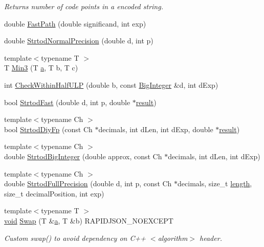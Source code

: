 \begin{DoxyCompactItemize}
\begin{DoxyCompactList}\small\item\em Returns number of code points in a encoded string. \end{DoxyCompactList}\item 
double \hyperlink{namespaceinternal_aa1bb51d788788eb5390a16462b40d98d}{Fast\+Path} (double significand, int exp)
\item 
double \hyperlink{namespaceinternal_a9e5fac4695310f09892fe52b1d24ab19}{Strtod\+Normal\+Precision} (double d, int p)
\item 
{\footnotesize template$<$typename T $>$ }\\T \hyperlink{namespaceinternal_ace304441347098a4953ea99f50805da9}{Min3} (T \hyperlink{pointer_8h_aeeddce917cf130d62c370b8f216026dd}{a}, T b, T c)
\item 
int \hyperlink{namespaceinternal_a190f9c286df64526a7e3550528ed6b02}{Check\+Within\+Half\+U\+LP} (double b, const \hyperlink{classinternal_1_1BigInteger}{Big\+Integer} \&d, int d\+Exp)
\item 
bool \hyperlink{namespaceinternal_a598b2d2f85130bff3c3942e4750b9185}{Strtod\+Fast} (double d, int p, double $\ast$\hyperlink{imgui__impl__opengl3__loader_8h_aa7f56a70231ed8bc64f97aa7c37fcb19}{result})
\item 
{\footnotesize template$<$typename Ch $>$ }\\bool \hyperlink{namespaceinternal_aab0ac7e895939a3e117ec8e3395fd334}{Strtod\+Diy\+Fp} (const Ch $\ast$decimals, int d\+Len, int d\+Exp, double $\ast$\hyperlink{imgui__impl__opengl3__loader_8h_aa7f56a70231ed8bc64f97aa7c37fcb19}{result})
\item 
{\footnotesize template$<$typename Ch $>$ }\\double \hyperlink{namespaceinternal_aa69b729bd9d047f70ba772424cfb65cb}{Strtod\+Big\+Integer} (double approx, const Ch $\ast$decimals, int d\+Len, int d\+Exp)
\item 
{\footnotesize template$<$typename Ch $>$ }\\double \hyperlink{namespaceinternal_a6109c750ee4707d4f71de280816a1a00}{Strtod\+Full\+Precision} (double d, int p, const Ch $\ast$decimals, size\+\_\+t \hyperlink{imgui__impl__opengl3__loader_8h_a011fc24f10426c01349e94a4edd4b0d5}{length}, size\+\_\+t decimal\+Position, int exp)
\item 
{\footnotesize template$<$typename T $>$ }\\\hyperlink{imgui__impl__opengl3__loader_8h_ac668e7cffd9e2e9cfee428b9b2f34fa7}{void} \hyperlink{namespaceinternal_a72b2c71d36273b9691487f58c671ce04}{Swap} (T \&\hyperlink{pointer_8h_aeeddce917cf130d62c370b8f216026dd}{a}, T \&b) R\+A\+P\+I\+D\+J\+S\+O\+N\+\_\+\+N\+O\+E\+X\+C\+E\+PT
\begin{DoxyCompactList}\small\item\em Custom swap() to avoid dependency on C++ $<$algorithm$>$ header. \end{DoxyCompactList}\end{DoxyCompactItemize}



